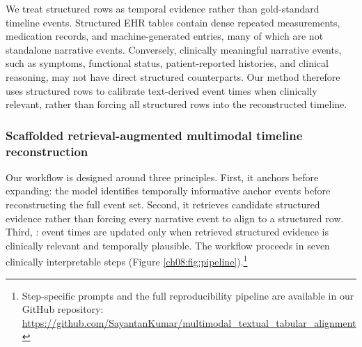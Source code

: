 
We treat structured rows as temporal evidence rather than gold-standard timeline events.
Structured EHR tables contain dense repeated measurements, medication records, and machine-generated entries, many of which are not standalone narrative events.
Conversely, clinically meaningful narrative events, such as symptoms, functional status, patient-reported histories, and clinical reasoning, may not have direct structured counterparts.
Our method therefore uses structured rows to calibrate text-derived event times when clinically relevant, rather than forcing all structured rows into the reconstructed timeline.




\subsubsection{Scaffolded retrieval-augmented multimodal timeline reconstruction}
\label{ch08:sec:pipeline}


Our workflow is designed around three principles.
First, it anchors before expanding: the model identifies temporally informative anchor events before reconstructing the full event set.
Second, it retrieves candidate structured evidence rather than forcing every narrative event to align to a structured row.
Third, : event times are updated only when retrieved structured evidence is clinically relevant and temporally plausible.
The workflow proceeds in seven clinically interpretable steps (Figure \ref{ch08:fig:pipeline}).\footnote{Step-specific prompts and the full reproducibility pipeline are available in our GitHub repository:\\\url{https://github.com/SayantanKumar/multimodal_textual_tabular_alignment}}

